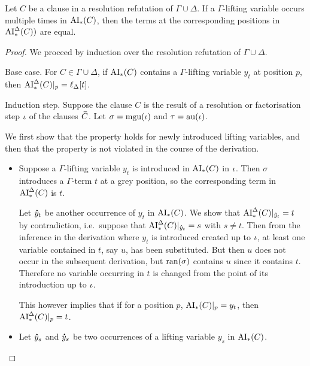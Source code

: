 \documentclass[,%
	draft=false,%
	numbers=noendperiod
	11pt,
	a4paper,
	oneside,%
	openany,
]{memoir}
\begin{document}
\begin{lemma}
	\label{lemma:ai_vs_aide_1}
	Let $C$ be a clause in a resolution refutation of $\Gamma\cup\Delta$.
	If a $\Gamma$-lifting variable occurs multiple times in $\operatorname{AI}_\mathrm{*}(C)$, then the terms at the corresponding positions in $\operatorname{AI}_\mathrm{*}^\Delta(C))$ are equal.
\end{lemma}
\begin{proof}
	We proceed by induction over the resolution refutation of $\Gamma\cup\Delta$.

	\begin{description}
		\item{} Base case.
			For $C \in \Gamma\cup\Delta$, if $\operatorname{AI}_\mathrm{*}(C)$ contains a $\Gamma$-lifting variable $y_t$ at position\nolinebreak{} $p$,
			then $\operatorname{AI}_\mathrm{*}^\Delta(C)|_{p} = \ell_{\Delta}[t]$.

		\item{} Induction step.
			Suppose the clause $C$ is the result of a resolution or factorisation step $\iota$ of the clauses $\bm\bar C$.
			Let $\sigma = \operatorname{mgu}(\iota)$ and $\tau = \operatorname{au}(\iota)$.

			We first show that the property holds for newly introduced lifting variables, and then that the property is not violated in the course of the derivation.

			\begin{itemize}
				\item
					Suppose a $\Gamma$-lifting variable $y_t$ is introduced in $\operatorname{AI}_\mathrm{*}(C)$ in $\iota$.
					Then $\sigma$ introduces a $\Gamma$-term $t$ at a grey position, so the corresponding term in $\operatorname{AI}_\mathrm{*}^\Delta(C)$ is $t$.

					Let $\bm\hat y_t$ be another occurrence of $y_t$ in $\operatorname{AI}_\mathrm{*}(C)$. We show that $\operatorname{AI}_\mathrm{*}^\Delta(C)|_{\bm\hat y_t} = t$ by contradiction, i.e.\ suppose that $\operatorname{AI}_\mathrm{*}^\Delta(C)|_{\bm\hat y_t} = s$ with $s\neq t$.
					Then from the inference in the derivation where $y_t$ is introduced created up to $\iota$, at least one variable contained in $t$, say $u$, has been substituted.
					But then $u$ does not occur in the subsequent derivation, but $\operatorname{ran}(\sigma)$ contains $u$ since it contains $t$. 
					Therefore no variable occurring in $t$ is changed from the point of its introduction up to $\iota$.

					This however implies that if for a position $p$, $\operatorname{AI}_\mathrm{*}(C)|_{p} = y_t$, then $\operatorname{AI}_\mathrm{*}^\Delta(C)|_{p} = t$.


				\item 
					Let $\bm\hat y_s$ and $\bm\dot y_s$ be two occurrences of a lifting variable $y_s$ in $\operatorname{AI}_\mathrm{*}(C)$.


\end{itemize}
\end{description}
\end{proof}
\end{document}
